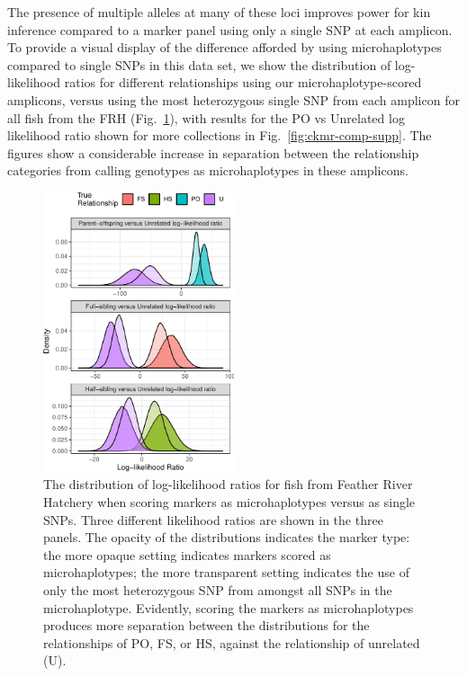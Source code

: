 The presence of multiple alleles at many of these loci improves power for
kin inference compared to a marker panel using only a single SNP at each
amplicon.  To provide a visual display of the difference afforded by using
microhaplotypes compared to single SNPs in this data set, we show the
distribution of log-likelihood ratios for different relationships using our microhaplotype-scored
amplicons, versus using the most heterozygous single SNP from each
amplicon for all fish from the FRH (Fig.~\ref{fig:ckmr-comp}), with results for the PO vs Unrelated
log likelihood ratio shown for more collections in Fig.~\ref{fig:ckmr-comp-supp}.  The figures show a considerable increase
in separation between the relationship categories from calling genotypes
as microhaplotypes in these amplicons.
\begin{figure}
\newcommand{\fprcap}{\footnotesize The distribution of log-likelihood ratios for
fish from Feather River Hatchery when scoring markers as microhaplotypes versus as
single SNPs.  Three different likelihood ratios are shown in the three panels.  The opacity
of the distributions indicates the marker type: the more opaque setting indicates markers
scored as microhaplotypes; the more transparent setting indicates the use of only the most
heterozygous SNP from amongst all SNPs in the microhaplotype.  Evidently, scoring the markers
as microhaplotypes produces more separation between the distributions for the relationships of PO, FS, or HS, against
the relationship of unrelated (U).}
\begin{center}
\includegraphics[width=0.5\textwidth]{images/frh-comp-figure-crop.pdf}
\end{center}
\caption[\fprcap]{\fprcap}
\label{fig:ckmr-comp}
\end{figure}


